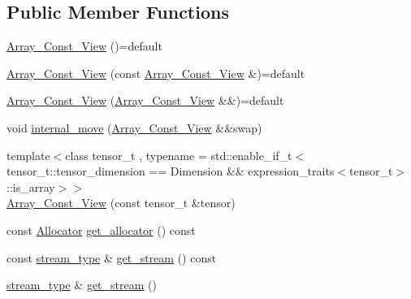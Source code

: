 \subsection*{Public Member Functions}
\begin{DoxyCompactItemize}
\item 
\hyperlink{structBC_1_1tensors_1_1exprs_1_1Array__Const__View_a2365ad25296b4fe97148ab12c0beb195}{Array\+\_\+\+Const\+\_\+\+View} ()=default
\item 
\hyperlink{structBC_1_1tensors_1_1exprs_1_1Array__Const__View_acac30a700235f57f5c343da97481f513}{Array\+\_\+\+Const\+\_\+\+View} (const \hyperlink{structBC_1_1tensors_1_1exprs_1_1Array__Const__View}{Array\+\_\+\+Const\+\_\+\+View} \&)=default
\item 
\hyperlink{structBC_1_1tensors_1_1exprs_1_1Array__Const__View_a7d7dd9f251f1b53129d0249e6079c19b}{Array\+\_\+\+Const\+\_\+\+View} (\hyperlink{structBC_1_1tensors_1_1exprs_1_1Array__Const__View}{Array\+\_\+\+Const\+\_\+\+View} \&\&)=default
\item 
void \hyperlink{structBC_1_1tensors_1_1exprs_1_1Array__Const__View_a12c8aa2fea3be876491353bb7999c173}{internal\+\_\+move} (\hyperlink{structBC_1_1tensors_1_1exprs_1_1Array__Const__View}{Array\+\_\+\+Const\+\_\+\+View} \&\&swap)
\item 
{\footnotesize template$<$class tensor\+\_\+t , typename  = std\+::enable\+\_\+if\+\_\+t$<$			tensor\+\_\+t\+::tensor\+\_\+dimension == Dimension \&\&			expression\+\_\+traits$<$tensor\+\_\+t$>$\+::is\+\_\+array$>$$>$ }\\\hyperlink{structBC_1_1tensors_1_1exprs_1_1Array__Const__View_a9e28e5b41e137b03e6a16d56484f7b70}{Array\+\_\+\+Const\+\_\+\+View} (const tensor\+\_\+t \&tensor)
\item 
const \hyperlink{namespaceBC_a934f94b17b06290e6b241e5f59930c5f}{Allocator} \hyperlink{structBC_1_1tensors_1_1exprs_1_1Array__Const__View_a0d8614794e0a4210bf8e654ffbc95271}{get\+\_\+allocator} () const 
\item 
const \hyperlink{structBC_1_1tensors_1_1exprs_1_1Array__Const__View_a8bb694230cd6fd0ff0f5b5cbe667614a}{stream\+\_\+type} \& \hyperlink{structBC_1_1tensors_1_1exprs_1_1Array__Const__View_a46e06b79c9abfeb2ca089867846bc642}{get\+\_\+stream} () const 
\item 
\hyperlink{structBC_1_1tensors_1_1exprs_1_1Array__Const__View_a8bb694230cd6fd0ff0f5b5cbe667614a}{stream\+\_\+type} \& \hyperlink{structBC_1_1tensors_1_1exprs_1_1Array__Const__View_ad2f920d2f6e782a3f5bc481872906e88}{get\+\_\+stream} ()
\end{DoxyCompactItemize}
